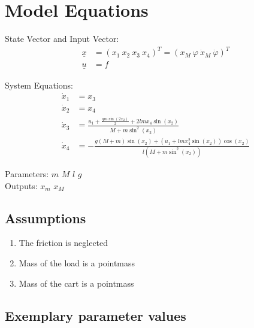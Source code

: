 \documentclass[10pt,a4paper]{article}
\begin{document}

	\section{Model Equations} %

	State Vector and Input Vector:
	\begin{align*}
		\underline{x} &= (x_1 \ x_2 \ x_3 \ x_4)^T = (x_M\ \varphi\ \dot{x}_M \ \dot{\varphi})^T\\
		\underline{u} &= f
	\end{align*}

	\noindent System Equations:
	\begin{subequations}
	\begin{align}
		\dot{x}_1 &= x_3 \\
		\dot{x}_2 &= x_4 \\
		\dot{x}_3 &= \frac{u_1 + \frac{gm\sin(2x_2)}{2} + 2lmx_4\sin(x_2)}{M + m\sin^2(x_2)} \\
		\dot{x}_4 &= - \frac{g(M + m)\sin(x_2) + (u_1 + lmx_4^2\sin(x_2))\cos(x_2)}{l(M + m\sin^2(x_2))}
	\end{align}
	\end{subequations}

	\noindent
	Parameters: $m$ $M$ $l$ $g$ %
	\\
	Outputs: $x_m$ $x_M$ %


	\subsection{Assumptions} %
		\begin{enumerate} %
			\item The friction is neglected
			\item Mass of the load is a pointmass
			\item Mass of the cart is a pointmass
		\end{enumerate}


	\subsection{Exemplary parameter values}
	
\end{document}
